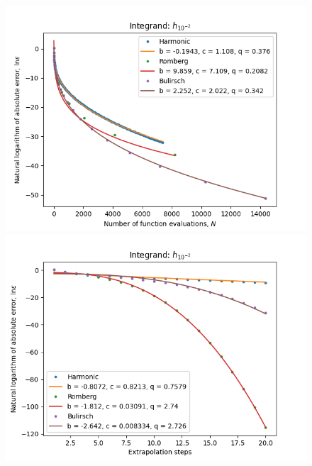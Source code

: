 \begin{figure}[H]
\centering
\begin{minipage}{0.45\textwidth}
\centering
\includegraphics[scale=0.45]{../results/romberg_plots/h_hundredth_hp_trend.png}
\end{minipage}
\begin{minipage}{0.45\textwidth}
\centering
\includegraphics[scale=0.45]{../results/romberg_plots/h_hundredth_hp_steps.png}
\end{minipage}
\end{figure}

